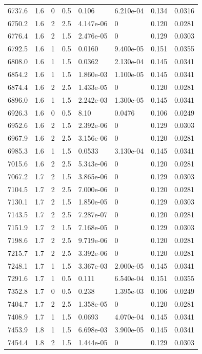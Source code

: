 \documentclass[preview]{standalone}
\begin{document}
{{{{\begin{tabular}{L{1.2cm}C{1.2cm} C{0.3cm}C{0.5cm} C{1.4cm}C{1.4cm} C{1.4cm}C{1.4cm}}
  6737.6  &   1.6  & 0     & 0.5 &  0.106  & 6.210e-04  & 0.134 &  0.0316   \\ 
  6750.2  &   1.6  & 2     & 2.5 &  4.147e-06  & 0  & 0.120 &  0.0281   \\ 
  6776.4  &   1.6  & 2     & 1.5 &  2.476e-05  & 0  & 0.129 &  0.0303   \\ 
  6792.5  &   1.6  & 1     & 0.5 &  0.0160  & 9.400e-05  & 0.151 &  0.0355   \\ 
  6808.0  &   1.6  & 1     & 1.5 &  0.0362  & 2.130e-04  & 0.145 &  0.0341   \\ 
  6854.2  &   1.6  & 1     & 1.5 &  1.860e-03  & 1.100e-05  & 0.145 &  0.0341   \\ 
  6874.4  &   1.6  & 2     & 2.5 &  1.433e-05  & 0  & 0.120 &  0.0281   \\ 
  6896.0  &   1.6  & 1     & 1.5 &  2.242e-03  & 1.300e-05  & 0.145 &  0.0341   \\ 
  6926.3  &   1.6  & 0     & 0.5 &  8.10  & 0.0476  & 0.106 &  0.0249   \\ 
  6952.6  &   1.6  & 2     & 1.5 &  2.392e-06  & 0  & 0.129 &  0.0303   \\ 
  6967.9  &   1.6  & 2     & 2.5 &  3.156e-06  & 0  & 0.120 &  0.0281   \\ 
  6985.3  &   1.6  & 1     & 1.5 &  0.0533  & 3.130e-04  & 0.145 &  0.0341   \\ 
  7015.6  &   1.6  & 2     & 2.5 &  5.343e-06  & 0  & 0.120 &  0.0281   \\ 
  7067.2  &   1.7  & 2     & 1.5 &  3.865e-06  & 0  & 0.129 &  0.0303   \\ 
  7104.5  &   1.7  & 2     & 2.5 &  7.000e-06  & 0  & 0.120 &  0.0281   \\ 
  7130.1  &   1.7  & 2     & 1.5 &  1.850e-05  & 0  & 0.129 &  0.0303   \\ 
  7143.5  &   1.7  & 2     & 2.5 &  7.287e-07  & 0  & 0.120 &  0.0281   \\ 
  7151.9  &   1.7  & 2     & 1.5 &  7.168e-05  & 0  & 0.129 &  0.0303   \\ 
  7198.6  &   1.7  & 2     & 2.5 &  9.719e-06  & 0  & 0.120 &  0.0281   \\ 
  7215.7  &   1.7  & 2     & 2.5 &  3.392e-06  & 0  & 0.120 &  0.0281   \\ 
  7248.1  &   1.7  & 1     & 1.5 &  3.367e-03  & 2.000e-05  & 0.145 &  0.0341   \\ 
  7291.6  &   1.7  & 1     & 0.5 &  0.111  & 6.540e-04  & 0.151 &  0.0355   \\ 
  7352.8  &   1.7  & 0     & 0.5 &  0.238  & 1.395e-03  & 0.106 &  0.0249   \\ 
  7404.7  &   1.7  & 2     & 2.5 &  1.358e-05  & 0  & 0.120 &  0.0281   \\ 
  7408.9  &   1.7  & 1     & 1.5 &  0.0693  & 4.070e-04  & 0.145 &  0.0341   \\ 
  7453.9  &   1.8  & 1     & 1.5 &  6.698e-03  & 3.900e-05  & 0.145 &  0.0341   \\ 
  7454.4  &   1.8  & 2     & 1.5 &  1.444e-05  & 0  & 0.129 &  0.0303   \\ 
\hline 
\end{tabular} 

}}}}
\end{document}
